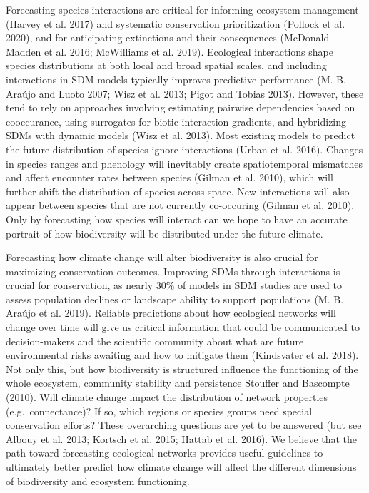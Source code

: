\documentclass[11pt]{article}
\begin{document}
Forecasting species interactions are critical for informing ecosystem
management (Harvey et al. 2017) and systematic conservation
prioritization (Pollock et al. 2020), and for anticipating extinctions
and their consequences (McDonald-Madden et al. 2016; McWilliams et al.
2019). Ecological interactions shape species distributions at both local
and broad spatial scales, and including interactions in SDM models
typically improves predictive performance (M. B. Araújo and Luoto 2007;
Wisz et al. 2013; Pigot and Tobias 2013). However, these tend to rely on
approaches involving estimating pairwise dependencies based on
cooccurance, using surrogates for biotic-interaction gradients, and
hybridizing SDMs with dynamic models (Wisz et al. 2013). Most existing
models to predict the future distribution of species ignore interactions
(Urban et al. 2016). Changes in species ranges and phenology will
inevitably create spatiotemporal mismatches and affect encounter rates
between species (Gilman et al. 2010), which will further shift the
distribution of species across space. New interactions will also appear
between species that are not currently co-occuring (Gilman et al. 2010).
Only by forecasting how species will interact can we hope to have an
accurate portrait of how biodiversity will be distributed under the
future climate.

Forecasting how climate change will alter biodiversity is also crucial
for maximizing conservation outcomes. Improving SDMs through
interactions is crucial for conservation, as nearly 30\% of models in
SDM studies are used to assess population declines or landscape ability
to support populations (M. B. Araújo et al. 2019). Reliable predictions
about how ecological networks will change over time will give us
critical information that could be communicated to decision-makers and
the scientific community about what are future environmental risks
awaiting and how to mitigate them (Kindsvater et al. 2018). Not only
this, but how biodiversity is structured influence the functioning of
the whole ecosystem, community stability and persistence Stouffer and
Bascompte (2010). Will climate change impact the distribution of network
properties (e.g.~connectance)? If so, which regions or species groups
need special conservation efforts? These overarching questions are yet
to be answered (but see Albouy et al. 2013; Kortsch et al. 2015; Hattab
et al. 2016). We believe that the path toward forecasting ecological
networks provides useful guidelines to ultimately better predict how
climate change will affect the different dimensions of biodiversity and
ecosystem functioning.
\end{document}
